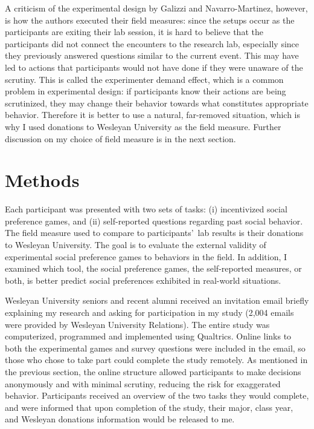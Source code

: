 \documentclass[12pt]{article}
\begin{document}
A criticism of the experimental design by Galizzi and Navarro-Martinez, however, is how the authors executed their field measures: since the setups occur as the participants are exiting their lab session, it is hard to believe that the participants did not connect the encounters to the research lab, especially since they previously answered questions similar to the current event. This may have led to actions that participants would not have done if they were unaware of the scrutiny. This is called the experimenter demand effect, which is a common problem in experimental design: if participants know their actions are being scrutinized, they may change their behavior towards what constitutes appropriate behavior. Therefore it is better to use a natural, far-removed situation, which is why I used donations to Wesleyan University as the field measure. Further discussion on my choice of field measure is in the next section.

\section{Methods}

Each participant was presented with two sets of tasks: (i) incentivized social preference games, and (ii) self-reported questions regarding past social behavior. The field measure used to compare to participants\rq \ lab results is their donations to Wesleyan University. The goal is to evaluate the external validity of experimental social preference games to behaviors in the field. In addition, I examined which tool, the social preference games, the self-reported measures, or both, is better predict social preferences exhibited in real-world situations.
 
Wesleyan University seniors and recent alumni received an invitation email briefly explaining my research and asking for participation in my study (2,004 emails were provided by Wesleyan University Relations). The entire study was computerized, programmed and implemented using Qualtrics. Online links to both the experimental games and survey questions were included in the email, so those who chose to take part could complete the study remotely. As mentioned in the previous section, the online structure allowed participants to make decisions anonymously and with minimal scrutiny, reducing the risk for exaggerated behavior. Participants received an overview of the two tasks they would complete, and were informed that upon completion of the study, their major, class year, and Wesleyan donations information would be released to me.
\end{document}
